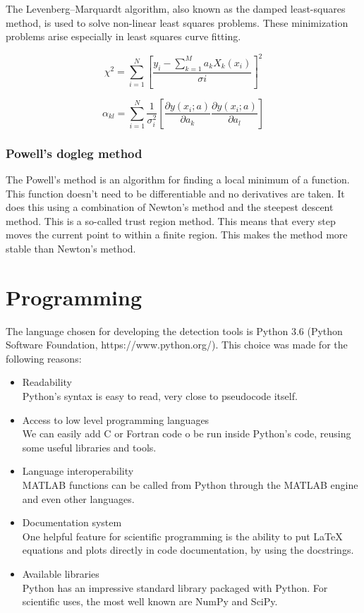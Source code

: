 \documentclass[12pt, a4paper, openany]{memoir}
\begin{document}
The Levenberg–Marquardt algorithm, also known as the damped least-squares method, is used to solve non-linear least squares problems. These minimization problems arise especially in least squares curve fitting.

\begin{equation}
\chi^2 = \sum_{i=1}^N \left[ \frac{y_i - \sum_{k=1}^M a_k X_k (x_i)}{\sigma i} \right]^2
\end{equation}

\begin{equation}
\alpha_{kl} = \sum_{i=1}^N \frac{1}{\sigma_i^2} \left[ \frac{\partial y(x_i;a)}{\partial a_k} \frac{\partial y(x_i;a)}{\partial a_l} \right]
\end{equation}

\subsubsection{Powell's dogleg method}

The Powell's method is an algorithm for finding a local minimum of a function. This function doesn't need to be differentiable and no derivatives are taken. It does this using a combination of Newton's method and the steepest descent method. This is a so-called trust region method. This means that every step moves the current point to within a finite region. This makes the method more stable than Newton's method.

\section{Programming}

The language chosen for developing the detection tools is Python 3.6 (Python Software Foundation, https://www.python.org/). This choice was made for the following reasons:
\begin{itemize}
	\item Readability \\
	Python's syntax is easy to read, very close to pseudocode itself.
	\item Access to low level programming languages \\
	We can easily add C or Fortran code o be run inside Python's code, reusing some useful libraries and tools.
	\item Language interoperability \\
	MATLAB functions can be called from Python through the MATLAB engine and even other languages.
	\item Documentation system \\
	One helpful feature for scientific programming is the ability to put LaTeX equations and plots directly in code documentation, by using the docstrings.
	\item Available libraries \\
	Python has an impressive standard library packaged with Python. For scientific uses, the most well known are NumPy and SciPy.
\end{itemize} 
\end{document}

